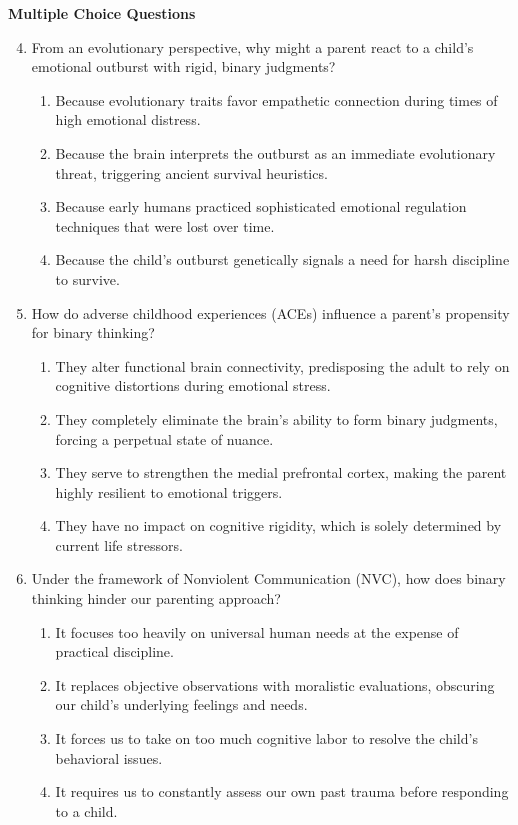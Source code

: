 \begin{practiceexercise}
\textbf{Multiple Choice Questions}
\begin{enumerate}
  \setcounter{enumi}{3}
  \item From an evolutionary perspective, why might a parent react to a child's emotional outburst with rigid, binary judgments?
  \begin{enumerate}
    \item Because evolutionary traits favor empathetic connection during times of high emotional distress.
    \item Because the brain interprets the outburst as an immediate evolutionary threat, triggering ancient survival heuristics.
    \item Because early humans practiced sophisticated emotional regulation techniques that were lost over time.
    \item Because the child's outburst genetically signals a need for harsh discipline to survive.
  \end{enumerate}
  \vspace{\fill}
  \item How do adverse childhood experiences (ACEs) influence a parent's propensity for binary thinking?
  \begin{enumerate}
    \item They alter functional brain connectivity, predisposing the adult to rely on cognitive distortions during emotional stress.
    \item They completely eliminate the brain's ability to form binary judgments, forcing a perpetual state of nuance.
    \item They serve to strengthen the medial prefrontal cortex, making the parent highly resilient to emotional triggers.
    \item They have no impact on cognitive rigidity, which is solely determined by current life stressors.
  \end{enumerate}
  \vspace{\fill}
  \item Under the framework of Nonviolent Communication (NVC), how does binary thinking hinder our parenting approach?
  \begin{enumerate}
    \item It focuses too heavily on universal human needs at the expense of practical discipline.
    \item It replaces objective observations with moralistic evaluations, obscuring our child's underlying feelings and needs.
    \item It forces us to take on too much cognitive labor to resolve the child's behavioral issues.
    \item It requires us to constantly assess our own past trauma before responding to a child.
  \end{enumerate}
\end{enumerate}
\vspace{\fill}
\newpage


\end{practiceexercise}
